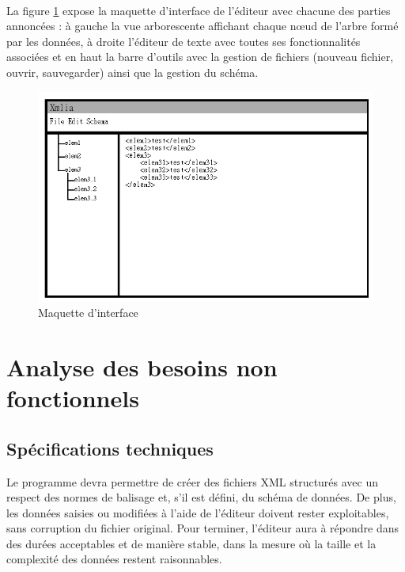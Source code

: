 \paragraph{}	
La figure \ref{maquette_interface} expose la maquette d'interface de l'éditeur avec chacune des parties annoncées : à gauche la vue arborescente affichant chaque nœud de l'arbre formé par les données, à droite l'éditeur de texte avec toutes ses fonctionnalités associées et en haut la barre d'outils avec la gestion de fichiers (nouveau fichier, ouvrir, sauvegarder) ainsi que la gestion du schéma.

\begin{figure}[h!]
\begin{minipage}[b]{\linewidth}
\centering \includegraphics[scale=0.5]{images/analyse-maquette.png}
\caption{Maquette d'interface}
\label{maquette_interface}
\end{minipage}
\end{figure}
	
\section{Analyse des besoins non fonctionnels}
\subsection{Spécifications techniques}
Le programme devra permettre de créer des fichiers XML structurés avec un respect des normes de balisage et, s'il est défini, du schéma de données. De plus, les données saisies ou modifiées à l'aide de l'éditeur doivent rester exploitables, sans corruption du fichier original. Pour terminer, l'éditeur aura à répondre dans des durées acceptables et de manière stable, dans la mesure où la taille et la complexité des données restent raisonnables.
		
